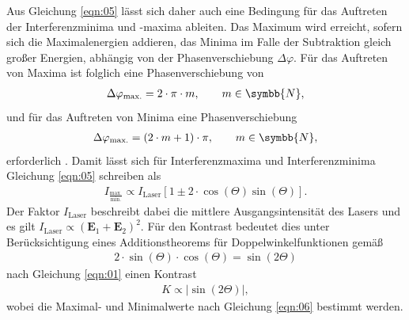 \noindent Aus Gleichung \ref{eqn:05} lässt sich daher auch eine Bedingung für
das Auftreten der Interferenzminima und -maxima ableiten. Das Maximum wird
erreicht, sofern sich die Maximalenergien addieren, das Minima im Falle der
Subtraktion gleich großer Energien, abhängig von der Phasenverschiebung $\Delta
\varphi$. Für das Auftreten von Maxima ist folglich eine Phasenverschiebung von
\begin{align*}
  \Delta \varphi_\text{max.} = 2 \cdot \pi \cdot m, \qquad m \in \symbb{N},
\end{align*}
\noindent und für das Auftreten von Minima eine Phasenverschiebung
\begin{align*}
  \Delta \varphi_\text{max.} = (2 \cdot m + 1) \cdot \pi, \qquad m \in \symbb{N},
\end{align*}
\noindent erforderlich \cite{hecht}. Damit lässt sich für Interferenzmaxima und
Interferenzminima Gleichung \ref{eqn:05} schreiben als
\begin{align}
  I_{\frac{\text{max.}}{\text{min.}}} \propto I_\text{Laser} \left[1 \pm 2 \cdot \cos(\Theta) \sin(\Theta) \right].
  \label{eqn:06}
\end{align}
\noindent Der Faktor $I_\text{Laser}$ beschreibt dabei die mittlere
Ausgangsintensität des Lasers und es gilt $I_\text{Laser} \propto (\textbf{E}_1 + \textbf{E}_2)^2$.
Für den Kontrast bedeutet dies unter Berücksichtigung eines Additionstheorems für
Doppelwinkelfunktionen gemäß
\begin{align}
  2 \cdot \sin(\Theta) \cdot \cos(\Theta) = \sin(2 \Theta)
  \label{eqn:01aa}
\end{align}
nach Gleichung \ref{eqn:01} einen Kontrast
\begin{align}
  K \propto | \sin(2 \Theta) |,
  \label{eqn:01b}
\end{align}
\noindent wobei die Maximal- und Minimalwerte nach Gleichung \ref{eqn:06}
bestimmt werden.
